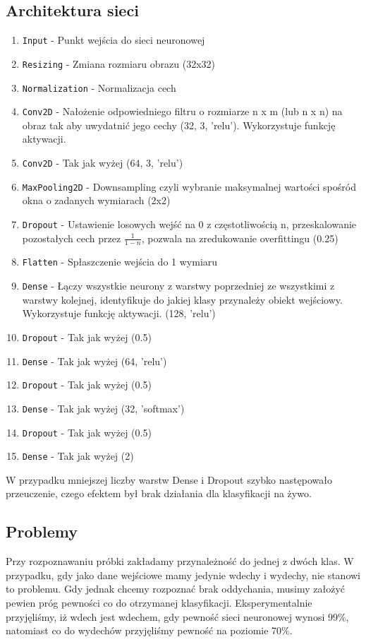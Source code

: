 \documentclass[polish]{article}
\begin{document}
\subsection{Architektura sieci}
\begin{enumerate}
  \item\texttt{Input} - Punkt wejścia do sieci neuronowej
  \item\texttt{Resizing} - Zmiana rozmiaru obrazu (32x32)
  \item\texttt{Normalization} - Normalizacja cech
  \item\texttt{Conv2D} - Nałożenie odpowiedniego filtru o rozmiarze n x m (lub n x n) na obraz tak aby uwydatnić jego cechy (32, 3, 'relu'). Wykorzystuje funkcję aktywacji.
  \item\texttt{Conv2D} - Tak jak wyżej (64, 3, 'relu')
  \item\texttt{MaxPooling2D} - Downsampling czyli wybranie maksymalnej wartości spośród okna o zadanych wymiarach (2x2)
  \item\texttt{Dropout} - Ustawienie losowych wejść na 0 z częstotliwością n, przeskalowanie pozostałych cech przez 
  $\frac{1}{1-n}$, pozwala na zredukowanie overfittingu (0.25)
  \item\texttt{Flatten} - Spłaszczenie wejścia do 1 wymiaru
  \item\texttt{Dense} - Łączy wszystkie neurony z warstwy poprzedniej ze wszystkimi z warstwy kolejnej, identyfikuje do jakiej klasy przynależy obiekt wejściowy. Wykorzystuje funkcję aktywacji. (128, 'relu')
  \item\texttt{Dropout} - Tak jak wyżej (0.5)
  \item\texttt{Dense} - Tak jak wyżej (64, 'relu')
  \item\texttt{Dropout} - Tak jak wyżej (0.5)
  \item\texttt{Dense} - Tak jak wyżej (32, 'softmax')
  \item\texttt{Dropout} - Tak jak wyżej (0.5)
  \item\texttt{Dense} - Tak jak wyżej (2)
\end{enumerate}
W przypadku mniejszej liczby  warstw Dense i Dropout szybko następowało przeuczenie, czego efektem był brak działania dla klasyfikacji na żywo.

\subsection{Problemy}
Przy rozpoznawaniu próbki zakładamy przynależność do jednej z dwóch klas. W przypadku, gdy jako dane wejściowe mamy jedynie wdechy i wydechy, nie stanowi to problemu. Gdy jednak chcemy rozpoznać brak oddychania, musimy założyć pewien próg pewności co do otrzymanej klasyfikacji. Eksperymentalnie przyjęliśmy, iż wdech jest wdechem, gdy pewność sieci neuronowej wynosi 99\%, natomiast co do wydechów przyjęliśmy pewność na poziomie 70\%. 
\end{document}
